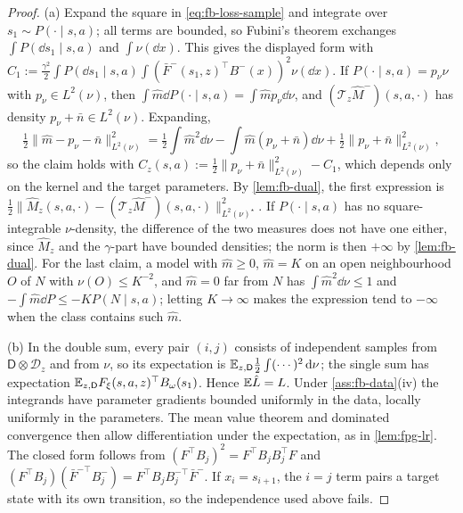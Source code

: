 \begin{proof}
(a) Expand the square in \eqref{eq:fb-loss-sample} and integrate over $s_1\sim P(\cdot\mid s,a)$; all terms are bounded, so Fubini's theorem exchanges $\int P(\dd s_1\mid s,a)$ and $\int\nu(\dd x)$.
This gives the displayed form with $C_1:=\frac{\gamma^2}2\int P(\dd s_1\mid s,a)\int(\bar F^-(s_1,z)^\top B^-(x))^2\nu(\dd x)$.
If $P(\cdot\mid s,a)=p_\nu\nu$ with $p_\nu\in L^2(\nu)$, then $\int\hat m\dd P(\cdot\mid s,a)=\int\hat mp_\nu\dd\nu$, and $(\mathcal T_z\hat M^-)(s,a,\cdot)$ has density $p_\nu+\bar n\in L^2(\nu)$. Expanding,
\[
\tfrac12\|\hat m-p_\nu-\bar n\|^2_{L^2(\nu)}=\tfrac12\int\hat m^2\dd\nu-\int\hat m(p_\nu+\bar n)\dd\nu+\tfrac12\|p_\nu+\bar n\|^2_{L^2(\nu)},
\]
so the claim holds with $C_z(s,a):=\frac12\|p_\nu+\bar n\|^2_{L^2(\nu)}-C_1$, which depends only on the kernel and the target parameters.
By \cref{lem:fb-dual}, the first expression is $\frac12\|\hat M_z(s,a,\cdot)-(\mathcal T_z\hat M^-)(s,a,\cdot)\|^2_{L^2(\nu)^\star}$.
If $P(\cdot\mid s,a)$ has no square-integrable $\nu$-density, the difference of the two measures does not have one either, since $\hat M_z$ and the $\gamma$-part have bounded densities; the norm is then $+\infty$ by \cref{lem:fb-dual}.
For the last claim, a model with $\hat m\ge0$, $\hat m=K$ on an open neighbourhood $O$ of $N$ with $\nu(O)\le K^{-2}$, and $\hat m=0$ far from $N$ has $\int\hat m^2\dd\nu\le1$ and $-\int\hat m\dd P\le-KP(N\mid s,a)$; letting $K\to\infty$ makes the expression tend to $-\infty$ when the class contains such $\hat m$.

(b) In the double sum, every pair $(i,j)$ consists of independent samples from $\mathsf D\otimes\mathcal D_z$ and from $\nu$, so its expectation is $\mathbb{E}_{z,\mathsf D}\frac12\int(\cdots)^2\,\mathrm{d}\nu$; the single sum has expectation $\mathbb{E}_{z,\mathsf D}F_\xi(s,a,z)^\top B_\omega(s_1)$. Hence $\mathbb{E}\hat L=L$.
Under \cref{ass:fb-data}(iv) the integrands have parameter gradients bounded uniformly in the data, locally uniformly in the parameters. The mean value theorem and dominated convergence then allow differentiation under the expectation, as in \cref{lem:fpg-lr}.
The closed form follows from $(F^\top B_j)^2=F^\top B_jB_j^\top F$ and $(F^\top B_j)(\bar F^{-\top}B^-_j)=F^\top B_jB^{-\top}_j\bar F^-$.
If $x_i=s_{i+1}$, the $i=j$ term pairs a target state with its own transition, so the independence used above fails.


\end{proof}
